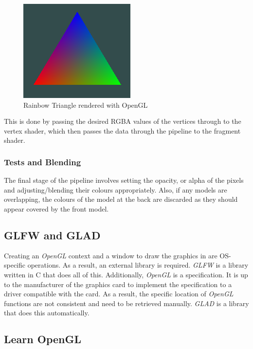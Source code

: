 \documentclass[a4paper, 12pt]{article}
\begin{document}
    \begin{figure}[H]
        \begin{center}
            \includegraphics{rainbowTriangle.png}
            \caption{Rainbow Triangle rendered with OpenGL}
        \end{center}
    \end{figure}

    This is done by passing the desired RGBA values of the vertices through to the vertex shader, which then passes the data through the pipeline to the fragment shader.

    \subsubsection{Tests and Blending}

    The final stage of the pipeline involves setting the opacity, or alpha of the pixels and adjusting/blending their colours appropriately. Also, if any models are overlapping, the colours of the model at the back are discarded as they should appear covered by the front model.

    \subsection{GLFW and GLAD}

    Creating an \textit{OpenGL} context and a window to draw the graphics in are OS-specific operations. As a result, an external library is required. \textit{GLFW}\cite{glfw} is a library written in C that does all of this. Additionally, \textit{OpenGL} is a specification. It is up to the manufacturer of the graphics card to implement the specification to a driver compatible with the card. As a result, the specific location of \textit{OpenGL} functions are not consistent and need to be retrieved manually. \textit{GLAD}\cite{glad} is a library that does this automatically.

    \subsection{Learn OpenGL}
\end{document}
